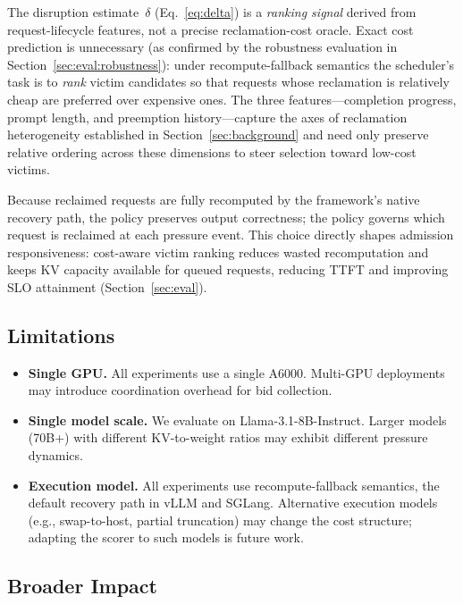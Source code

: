 \documentclass[sigconf,nonacm]{acmart}
\newcommand{\qualdelta}{\ensuremath{\delta}}
\begin{document}
The disruption estimate~$\qualdelta$ (Eq.~\ref{eq:delta}) is a
\emph{ranking signal} derived from request-lifecycle features, not a precise
reclamation-cost oracle.  Exact cost prediction is unnecessary (as confirmed by the robustness evaluation in Section~\ref{sec:eval:robustness}): under
recompute-fallback semantics the scheduler's task is to \emph{rank} victim
candidates so that requests whose reclamation is relatively cheap are
preferred over expensive ones.  The three features---completion progress,
prompt length, and preemption history---capture the axes of reclamation
heterogeneity established in Section~\ref{sec:background} and need only
preserve relative ordering across these dimensions to steer selection
toward low-cost victims.

Because reclaimed requests are fully recomputed by the framework's native
recovery path, the policy preserves output correctness; the policy governs
which request is reclaimed at each pressure event.
This choice directly shapes admission responsiveness: cost-aware
victim ranking reduces wasted recomputation and keeps KV capacity available
for queued requests, reducing TTFT and improving SLO attainment
(Section~\ref{sec:eval}).

\subsection{Limitations}

\begin{itemize}[leftmargin=*,nosep]
\item \textbf{Single GPU.}  All experiments use a single A6000.  Multi-GPU
  deployments may introduce coordination overhead for bid collection.
\item \textbf{Single model scale.}  We evaluate on Llama-3.1-8B-Instruct.
  Larger models (70B+) with different KV-to-weight ratios may exhibit
  different pressure dynamics.
\item \textbf{Execution model.}  All experiments use recompute-fallback
  semantics, the default recovery path in vLLM and SGLang.  Alternative
  execution models (e.g., swap-to-host, partial truncation) may change
  the cost structure; adapting the scorer to such models is future work.
\end{itemize}

\subsection{Broader Impact}
\end{document}

